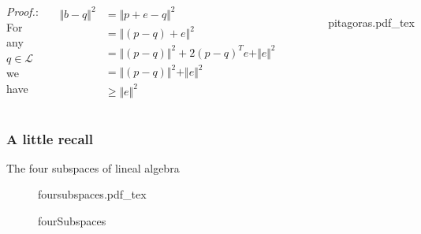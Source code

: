 \documentclass[aspectratio=169]{beamer}
\newcommand{\incfig}[2][1]{%
    \def\svgwidth{#1\columnwidth}
    {#2.pdf_tex} }
\begin{document}
\begin{frame}{} %
	
	\begin{columns}
	
	

{\color{violet} \textit{Proof.}:} For any $q \in \mathcal{L}$ we have

\begin{align*}
	\Vert b-q \Vert^2 &=  \Vert  p + e - q \Vert^2\\ 
	&= \Vert (p - q) + e \Vert^2 \\
	&= \Vert (p - q) \Vert^2  + 2(p-q)^Te+ \Vert e \Vert^2\\ 
	&= \Vert (p - q) \Vert^2 + \Vert e \Vert^2 \\
	& \geq \Vert e \Vert^2
\end{align*}
		
		
\begin{figure}[ht]
    \centering
    \incfig{pitagoras}
    \label{fig:pitagoras}
\end{figure}

\end{columns}

\end{frame}

\begin{frame} %
	\frametitle{A little recall}{The four subspaces of lineal algebra}
 
\begin{figure}[ht]
    \centering
    \incfig{foursubspaces}
    \caption{fourSubspaces}
    \label{fig:foursubspaces}
\end{figure}

\end{frame}
\end{document}

